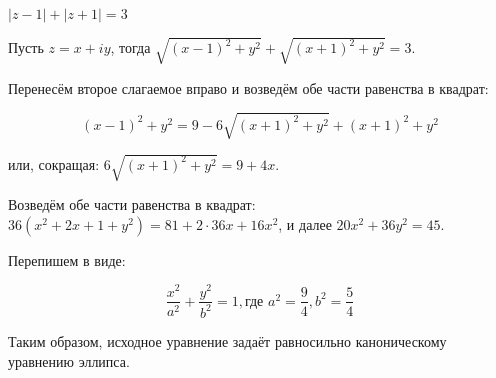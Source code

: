 \documentclass[a4paper,14pt]{article}
\DeclareMathOperator{\realpart}{\mathop{Re}}	%
\DeclareMathOperator{\imgpart}{\mathop{Im}} 	%
\begin{document}
\begin{exmp}
	$|z-1|+|z+1|=3$
	
	Пусть $z=x+iy$, тогда $\sqrt{(x-1)^2+y^2}+\sqrt{(x+1)^2+y^2}=3$.
	
	\noindent Перенесём второе слагаемое вправо и возведём обе части равенства в квадрат:
	
	\[(x-1)^2+y^2=9-6\sqrt{(x+1)^2+y^2}+(x+1)^2+y^2\]
	
	\noindent или, сокращая: $6\sqrt{(x+1)^2+y^2}=9+4x$.
	
	Возведём обе части равенства в квадрат: $36(x^2+2x+1+y^2)=81+2 \cdot 36x+16x^2$, и далее $20x^2+36y^2=45$.
	
	\noindent Перепишем в виде:
	
	\[\frac{x^2}{a^2}+\frac{y^2}{b^2}=1, \text{где } a^2=\frac{9}{4}, b^2=\frac{5}{4}\]
	
	\noindent Таким образом, исходное уравнение задаёт равносильно каноническому уравнению эллипса.
	
	\begin{figure}[!htbp]
		\begin{center}
		\end{center}
	\end{figure}
\end{exmp}
\end{document}
